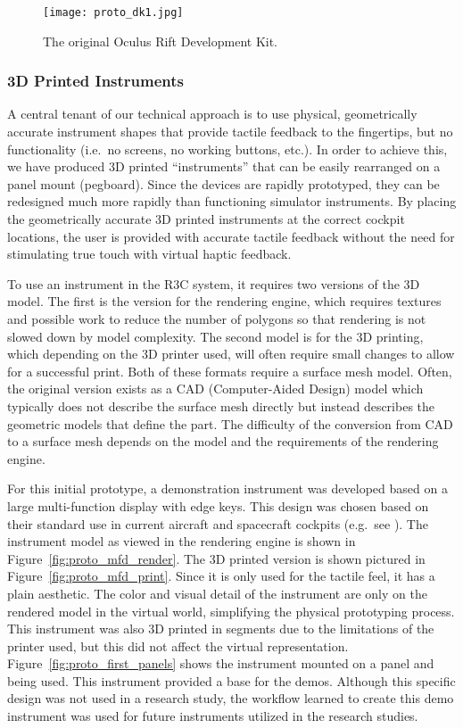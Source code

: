 \begin{figure}
    \centering
    \texttt{[image: proto\_dk1.jpg]}
    \caption{The original Oculus Rift Development Kit.}
    \label{fig:proto_oculus}
\end{figure}

\subsubsection{3D Printed Instruments}

A central tenant of our technical approach is to use physical, geometrically accurate instrument shapes that provide tactile feedback to the fingertips, but no functionality (i.e.\ no screens, no working buttons, etc.).
In order to achieve this, we have produced 3D printed ``instruments'' that can be easily rearranged on a panel mount (pegboard).
Since the devices are rapidly prototyped, they can be redesigned much more rapidly than functioning simulator instruments.
By placing the geometrically accurate 3D printed instruments at the correct cockpit locations, the user is provided with accurate tactile feedback without the need for stimulating true touch with virtual haptic feedback.

To use an instrument in the R3C system, it requires two versions of the 3D model.
The first is the version for the rendering engine, which requires textures and possible work to reduce the number of polygons so that rendering is not slowed down by model complexity.
The second model is for the 3D printing, which depending on the 3D printer used, will often require small changes to allow for a successful print.
Both of these formats require a surface mesh model.
Often, the original version exists as a CAD (Computer-Aided Design) model which typically does not describe the surface mesh directly but instead describes the geometric models that define the part.
The difficulty of the conversion from CAD to a surface mesh depends on the model and the requirements of the rendering engine.

For this initial prototype, a demonstration instrument was developed based on a large multi-function display with edge keys.
This design was chosen based on their standard use in current aircraft and spacecraft cockpits (e.g.\ see \citet{us_department_of_defense_department_1999}).
The instrument model as viewed in the rendering engine is shown in Figure~\ref{fig:proto_mfd_render}.
The 3D printed version is shown pictured in Figure~\ref{fig:proto_mfd_print}.
Since it is only used for the tactile feel, it has a plain aesthetic.
The color and visual detail of the instrument are only on the rendered model in the virtual world, simplifying the physical prototyping process.
This instrument was also 3D printed in segments due to the limitations of the printer used, but this did not affect the virtual representation.
Figure~\ref{fig:proto_first_panels} shows the instrument mounted on a panel and being used.
This instrument provided a base for the demos.
Although this specific design was not used in a research study, the workflow learned to create this demo instrument was used for future instruments utilized in the research studies.

